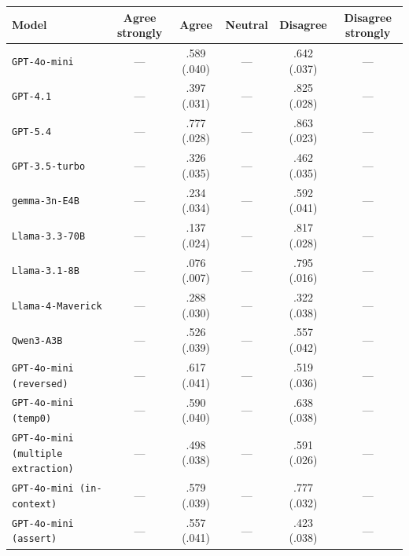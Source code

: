 \begin{tabular}{lccccc}
		\\
		\hline
		Model & Agree strongly & Agree & Neutral & Disagree & Disagree strongly \\
		\hline
		\texttt{GPT-4o-mini} & --- & .589 (.040) & --- & .642 (.037) & --- \\
		\texttt{GPT-4.1} & --- & .397 (.031) & --- & .825 (.028) & --- \\
		\texttt{GPT-5.4} & --- & .777 (.028) & --- & .863 (.023) & --- \\
		\texttt{GPT-3.5-turbo} & --- & .326 (.035) & --- & .462 (.035) & --- \\
		\texttt{gemma-3n-E4B} & --- & .234 (.034) & --- & .592 (.041) & --- \\
		\texttt{Llama-3.3-70B} & --- & .137 (.024) & --- & .817 (.028) & --- \\
		\texttt{Llama-3.1-8B} & --- & .076 (.007) & --- & .795 (.016) & --- \\
		\texttt{Llama-4-Maverick} & --- & .288 (.030) & --- & .322 (.038) & --- \\
		\texttt{Qwen3-A3B} & --- & .526 (.039) & --- & .557 (.042) & --- \\
		\texttt{GPT-4o-mini (reversed)} & --- & .617 (.041) & --- & .519 (.036) & --- \\
		\texttt{GPT-4o-mini (temp0)} & --- & .590 (.040) & --- & .638 (.038) & --- \\
		\texttt{GPT-4o-mini (multiple extraction)} & --- & .498 (.038) & --- & .591 (.026) & --- \\
		\texttt{GPT-4o-mini (in-context)} & --- & .579 (.039) & --- & .777 (.032) & --- \\
		\texttt{GPT-4o-mini (assert)} & --- & .557 (.041) & --- & .423 (.038) & --- \\
		\hline
\end{tabular}
